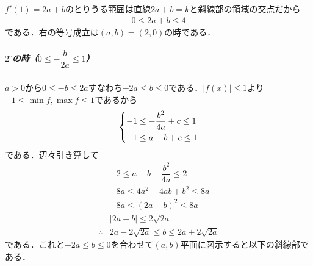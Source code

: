 \documentclass[../../main.tex]{subfiles}
\begin{document}
$f'(1)=2a+b$のとりうる範囲は直線$2a+b=k$と斜線部の領域の交点だから
\begin{align}
  0\le2a+b\le4
\end{align}
である．右の等号成立は$(a,b)=(2,0)$の時である．

\subparagraph{$2^{\circ}$の時（$0\le-\dfrac{b}{2a}\le 1$）}

$a>0$から$0 \le -b \le 2a$すなわち$-2a \le b \le 0$である．$|f(x)| \le 1$より$-1 \le \min f, \max f \le 1$であるから
\begin{align}
  \begin{dcases}
    -1 \le -\dfrac{b^2}{4a}+c \le 1 \\
    -1 \le a-b+c \le 1
  \end{dcases}
\end{align}
である．辺々引き算して
\begin{align}
  & -2 \le a-b+\dfrac{b^2}{4a} \le 2 \\
  & -8a \le 4a^2-4ab+b^2 \le 8a \\
  & -8a \le (2a-b)^2 \le 8a \\
  &\left|2a-b\right| \le 2\sqrt{2a} \\
  \therefore
  & 2a - 2\sqrt{2a} \le b \le 2a + 2\sqrt{2a}
\end{align}
である．これと$-2a \le b \le 0$を合わせて$(a,b)$平面に図示すると以下の斜線部である．
\end{document}
